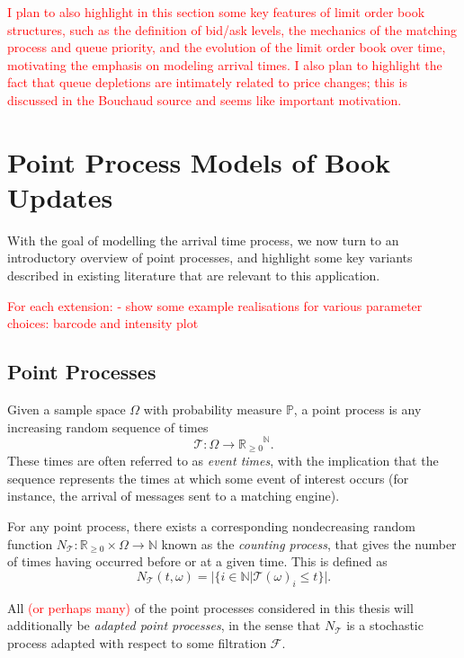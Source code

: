 \documentclass[honours,12pt]{unswthesis}
\numberwithin{equation}{section}
\begin{document}
\textcolor{red}{I plan to also highlight in this section some key features of limit order book structures, such as the definition of bid/ask levels, the mechanics of the matching process and queue priority, and the evolution of the limit order book over time, motivating the emphasis on modeling arrival times. I also plan to highlight the fact that queue depletions are intimately related to price changes; this is discussed in the Bouchaud source and seems like important motivation.}

\section{Point Process Models of Book Updates}
With the goal of modelling the arrival time process, we now turn to an introductory overview of point processes, and highlight some key variants described in existing literature that are relevant to this application.

\textcolor{red}{
For each extension:
- show some example realisations for various parameter choices: barcode and intensity plot
}

\subsection{Point Processes}


Given a sample space $\Omega$ with probability measure $\mathbb P$, a point process is any increasing random sequence of times $$\mathcal T:\Omega\to{\mathbb{R}_{\geq 0}}^\mathbb{N}.$$
These times are often referred to as \textit{event times}, with the implication that the sequence represents the times at which some event of interest occurs (for instance, the arrival of messages sent to a matching engine).

{\noindent}For any point process, there exists a corresponding nondecreasing random function $N_{\mathcal T}:\mathbb{R}_{\geq 0}\times\Omega\to\mathbb{N}$ known as the \textit{counting process}, that gives the number of times having occurred before or at a given time. This is defined as
$$N_{\mathcal T}(t,\omega) = \vert \{i\in\mathbb N \vert \mathcal{T}(\omega)_i \leq t\} \vert.$$

{\noindent}All \textcolor{red}{(or perhaps many)} of the point processes considered in this thesis will additionally be \textit{adapted point processes}, in the sense that $N_{\mathcal T}$ is a stochastic process adapted with respect to some filtration $\mathcal F$.
\end{document}
